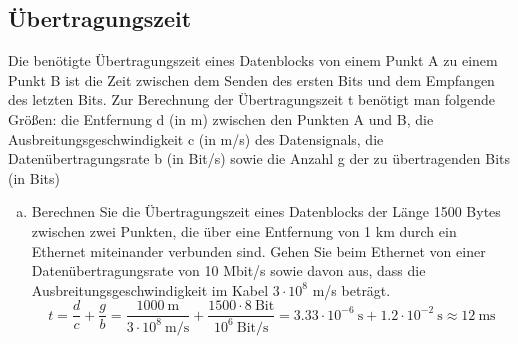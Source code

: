 \setcounter{section}{2}
\setcounter{subsection}{0} %
\subsection{Übertragungszeit}

Die benötigte Übertragungszeit eines Datenblocks von einem Punkt A zu einem
Punkt B ist die Zeit zwischen dem Senden des ersten Bits und dem Empfangen des
letzten Bits. Zur Berechnung der Übertragungszeit t benötigt man folgende
Größen: die Entfernung d (in m) zwischen den Punkten A und B, die
Ausbreitungsgeschwindigkeit c (in m/s) des Datensignals, die
Datenübertragungsrate b (in Bit/s) sowie die Anzahl g der zu übertragenden Bits
(in Bits)

\begin{enumerate}[(a)]
    \item Berechnen Sie die Übertragungszeit eines Datenblocks der Länge 1500
        Bytes zwischen zwei Punkten, die über eine Entfernung von 1 km durch
        ein Ethernet miteinander verbunden sind. Gehen Sie beim Ethernet von
        einer Datenübertragungsrate von 10 Mbit/s sowie davon aus, dass die
        Ausbreitungsgeschwindigkeit im Kabel $3 \cdot 10^8$ m/s beträgt.
        \begin{equation*}
            t = \dfrac{d}{c} + \dfrac{g}{b} =
                \dfrac{1000\ \text{m}}{3 \cdot 10^8\ \text{m/s}} + \dfrac{1500 \cdot 8\ \text{Bit}}{10^6\ \text{Bit/s}} =
                3.33 \cdot 10^{-6}\ \text{s} + 1.2 \cdot 10^{-2}\ \text{s} \approx 12\ \text{ms}
        \end{equation*}


\end{enumerate}
